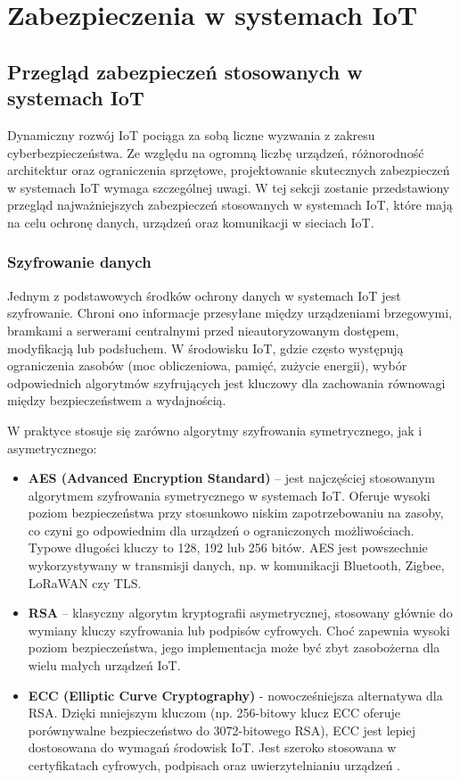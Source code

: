 \chapter{Zabezpieczenia w systemach IoT}
\label{chap:rozdzial3}
\section{Przegląd zabezpieczeń stosowanych w systemach IoT}
Dynamiczny rozwój IoT pociąga za sobą liczne wyzwania z zakresu cyberbezpieczeństwa. Ze względu na ogromną liczbę urządzeń, różnorodność architektur oraz ograniczenia sprzętowe, projektowanie skutecznych zabezpieczeń w systemach IoT wymaga szczególnej uwagi.
W tej sekcji zostanie przedstawiony przegląd najważniejszych zabezpieczeń stosowanych w systemach IoT, które mają na celu ochronę danych, urządzeń oraz komunikacji w sieciach IoT.
\subsection{Szyfrowanie danych}
Jednym z podstawowych środków ochrony danych w systemach IoT jest szyfrowanie. Chroni ono informacje przesyłane między urządzeniami brzegowymi, bramkami a serwerami centralnymi przed nieautoryzowanym dostępem, modyfikacją lub podsłuchem. W środowisku IoT, gdzie często występują ograniczenia zasobów (moc obliczeniowa, pamięć, zużycie energii), wybór odpowiednich algorytmów szyfrujących jest kluczowy dla zachowania równowagi między bezpieczeństwem a wydajnością.

W praktyce stosuje się zarówno algorytmy szyfrowania symetrycznego, jak i asymetrycznego:
\begin{itemize}
    \item \textbf{AES (Advanced Encryption Standard)} – jest najczęściej stosowanym algorytmem szyfrowania symetrycznego w systemach IoT. Oferuje wysoki poziom bezpieczeństwa przy stosunkowo niskim zapotrzebowaniu na zasoby, co czyni go odpowiednim dla urządzeń o ograniczonych możliwościach. Typowe długości kluczy to 128, 192 lub 256 bitów. AES jest powszechnie wykorzystywany w transmisji danych, np. w komunikacji Bluetooth, Zigbee, LoRaWAN czy TLS.
    
    \item \textbf{RSA} – klasyczny algorytm kryptografii asymetrycznej, stosowany głównie do wymiany kluczy szyfrowania lub podpisów cyfrowych. Choć zapewnia wysoki poziom bezpieczeństwa, jego implementacja może być zbyt zasobożerna dla wielu małych urządzeń IoT.
    
    \item \textbf{ECC (Elliptic Curve Cryptography)} - nowocześniejsza alternatywa dla RSA. Dzięki mniejszym kluczom (np. 256-bitowy klucz ECC oferuje porównywalne bezpieczeństwo do 3072-bitowego RSA), ECC jest lepiej dostosowana do wymagań środowisk IoT. Jest szeroko stosowana w certyfikatach cyfrowych, podpisach oraz uwierzytelnianiu urządzeń \cite{nist_keylength}.
\end{itemize}

